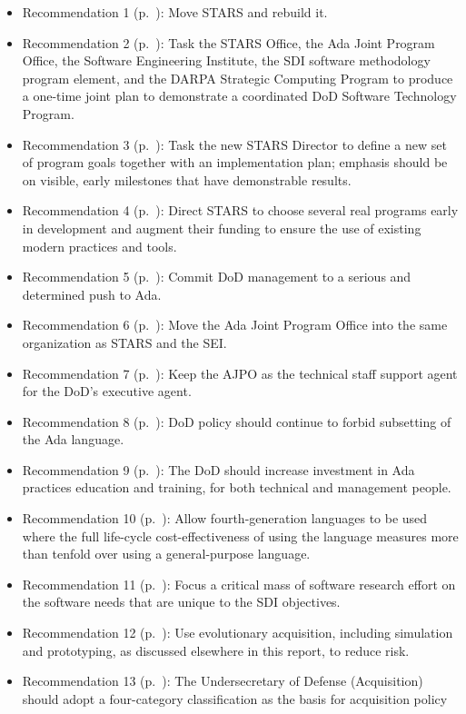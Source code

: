 \documentclass[12pt,final]{article}
\begin{document}
\begin{itemize}
    \item Recommendation 1 (p.~\pageref{rec:1}): Move STARS and rebuild it.
    \item Recommendation 2 (p.~\pageref{rec:2}): Task the STARS Office, the Ada Joint Program Office, the Software Engineering Institute, the SDI software methodology program element, and the DARPA Strategic Computing Program to produce a one-time joint plan to demonstrate a coordinated DoD Software Technology Program.
    \item Recommendation 3 (p.~\pageref{rec:3}): Task the new STARS Director to define a new set of program goals together with an implementation plan; emphasis should be on visible, early milestones that have demonstrable results.
    \item Recommendation 4 (p.~\pageref{rec:4}): Direct STARS to choose several real programs early in development and augment their funding to ensure the use of existing modern practices and tools.
    \item Recommendation 5 (p.~\pageref{rec:5}): Commit DoD management to a serious and determined push to Ada.
    \item Recommendation 6 (p.~\pageref{rec:6}): Move the Ada Joint Program Office into the same organization as STARS and the SEI.
    \item Recommendation 7 (p.~\pageref{rec:7}): Keep the AJPO as the technical staff support agent for the DoD’s executive agent.
    \item Recommendation 8 (p.~\pageref{rec:8}): DoD policy should continue to forbid subsetting of the Ada language.
    \item Recommendation 9 (p.~\pageref{rec:9}): The DoD should increase investment in Ada practices education and training, for both technical and management people.
    \item Recommendation 10 (p.~\pageref{rec:10}): Allow fourth-generation languages to be used where the full life-cycle cost-effectiveness of using the language measures more than tenfold over using a general-purpose language.
    \item Recommendation 11 (p.~\pageref{rec:11}): Focus a critical mass of software research effort on the software needs that are unique to the SDI objectives.
    \item Recommendation 12 (p.~\pageref{rec:12}): Use evolutionary acquisition, including simulation and prototyping, as discussed elsewhere in this report, to reduce risk.
    \item Recommendation 13 (p.~\pageref{rec:13}): The Undersecretary of Defense (Acquisition) should adopt a four-category classification as the basis for acquisition policy

\end{itemize}
\end{document}
